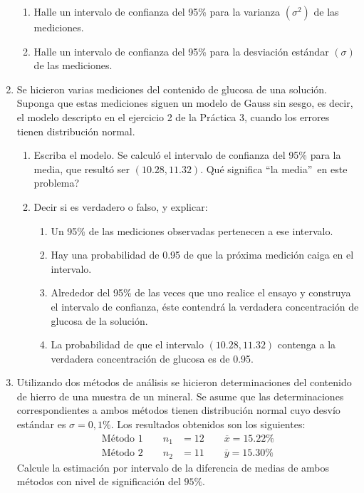 \documentclass[11pt,a4paper,twoside]{article}%
\begin{document}
\begin{enumerate}
\begin{enumerate}
\item Halle un intervalo de confianza del 95\% para la varianza $\left(
\sigma^{2}\right)  $ de las mediciones.

\item Halle un intervalo de confianza del 95\% para la desviaci\'{o}n
est\'{a}ndar $\left(  \sigma\right)  $ de las mediciones.
\end{enumerate}

\item Se hicieron varias mediciones del contenido de glucosa de una
soluci\'{o}n. Suponga que estas mediciones siguen un modelo de Gauss sin
sesgo, es decir, el modelo descripto en el ejercicio 2 de la Pr\'{a}ctica 3,
cuando los errores tienen distribuci\'{o}n normal.

\begin{enumerate}
\item Escriba el modelo. Se calcul\'{o} el intervalo de confianza del 95\%
para la media, que result\'{o} ser $(10.28,11.32)$. \textquestiondown Qu\'{e}
significa \textquotedblleft la media\textquotedblright\ en este problema?

\item Decir si es verdadero o falso, y explicar:

\begin{enumerate}
\item Un 95\% de las mediciones observadas pertenecen a ese intervalo.

\item Hay una probabilidad de 0.95 de que la pr\'{o}xima medici\'{o}n caiga en
el intervalo.

\item Alrededor del 95\% de las veces que uno realice el ensayo y construya el
intervalo de confianza, \'{e}ste contendr\'{a} la verdadera concentraci\'{o}n
de glucosa de la soluci\'{o}n.

\item La probabilidad de que el intervalo $(10.28,11.32)$ contenga a la
verdadera concentraci\'{o}n de glucosa es de 0.95.
\end{enumerate}
\end{enumerate}


\item Utilizando dos m\'{e}todos de an\'{a}lisis se hicieron determinaciones
del contenido de hierro de una muestra de un mineral. Se asume que las
determinaciones correspondientes a ambos m\'{e}todos tienen distribuci\'{o}n
normal cuyo desv\'io est\'andar es $\sigma=0,1 \%$. Los resultados obtenidos son los siguientes:%
\begin{align*}
\text{M\'{e}todo 1}\qquad n_{1}  &  =12\qquad\overline{x}=15.22\%\\
\text{M\'{e}todo 2}\qquad n_{2}  &  =11\qquad\overline{y}=15.30\%
\end{align*}
Calcule la estimaci\'on por intervalo de la diferencia de medias de ambos m\'etodos con nivel de significaci\'on del $95 \%$.


\end{enumerate}
\end{document}
